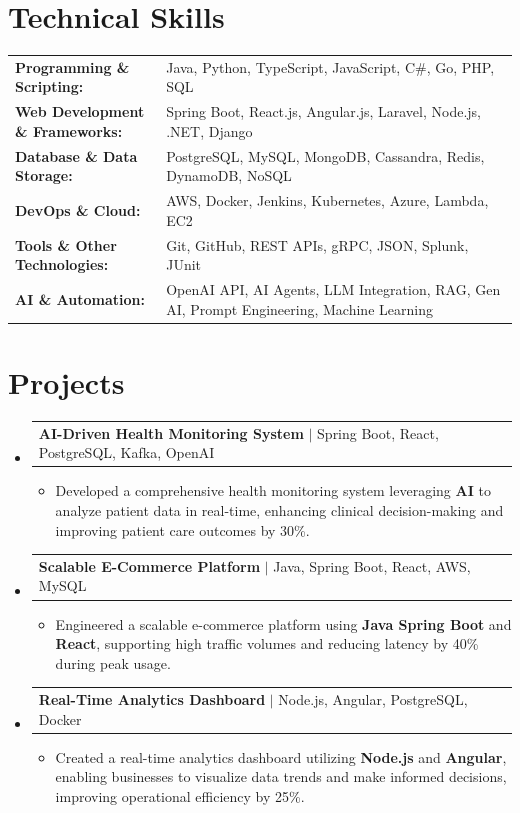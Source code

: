 \documentclass[letterpaper,10pt]{article}
\makeatletter
\newcommand{\resumeItem}[1]{
  \item{\fontsize{8pt}{9pt}\selectfont
    #1 \vspace{-3pt}
  }
}
\newcommand{\resumeProjectHeading}[2]{
    \item
    \begin{tabular*}{1.001\textwidth}{l@{\extracolsep{\fill}}r}
      \fontsize{8.5pt}{10pt}#1 & \textbf{\fontsize{8.5pt}{10pt} #2}\\
    \end{tabular*}\vspace{-7pt}
}
\newcommand{\resumeSubHeadingListStart}{\begin{itemize}[leftmargin=0pt, label={}]}
\newcommand{\resumeSubHeadingListEnd}{\end{itemize}}
\newcommand{\resumeItemListStart}{\begin{itemize}[leftmargin=*]}
\newcommand{\resumeItemListEnd}{\end{itemize}\vspace{-5pt}}
\makeatother
\begin{document}
\section{Technical Skills}
        \vspace{-14pt}
        \begin{table}[h]
            \fontsize{8pt}{9pt}\selectfont
            \begin{tabular}{p{0.3\linewidth} p{0.7\linewidth}}
                \textbf{Programming \& Scripting:} & Java, Python, TypeScript, JavaScript, C\#, Go, PHP, SQL \\
                \textbf{Web Development \& Frameworks:} & Spring Boot, React.js, Angular.js, Laravel, Node.js, .NET, Django \\
                \textbf{Database \& Data Storage:} & PostgreSQL, MySQL, MongoDB, Cassandra, Redis, DynamoDB, NoSQL \\
                \textbf{DevOps \& Cloud:} & AWS, Docker, Jenkins, Kubernetes, Azure, Lambda, EC2 \\
                \textbf{Tools \& Other Technologies:} & Git, GitHub, REST APIs, gRPC, JSON, Splunk, JUnit \\
                \textbf{AI \& Automation:} & OpenAI API, AI Agents, LLM Integration, RAG, Gen AI, Prompt Engineering, Machine Learning \\
            \end{tabular}
        \end{table}
 \vspace{-18pt}

\section{Projects}
    \vspace{-5pt}
    \resumeSubHeadingListStart
          \resumeProjectHeading
            {\textbf{AI-Driven Health Monitoring System} $|$ Spring Boot, React, PostgreSQL, Kafka, OpenAI}{}
            \resumeItemListStart
                \resumeItem{Developed a comprehensive health monitoring system leveraging \textbf{AI} to analyze patient data in real-time, enhancing clinical decision-making and improving patient care outcomes by 30\%.}
            \resumeItemListEnd
        \vspace{-12pt}
    
        \resumeProjectHeading
            {\textbf{Scalable E-Commerce Platform} $|$ Java, Spring Boot, React, AWS, MySQL}{}
        \resumeItemListStart
                \resumeItem{Engineered a scalable e-commerce platform using \textbf{Java Spring Boot} and \textbf{React}, supporting high traffic volumes and reducing latency by 40\% during peak usage.}
        \resumeItemListEnd
      \vspace{-12pt}
      \resumeProjectHeading
        {\textbf{Real-Time Analytics Dashboard} $|$ Node.js, Angular, PostgreSQL, Docker}{}
    \resumeItemListStart
            \resumeItem{Created a real-time analytics dashboard utilizing \textbf{Node.js} and \textbf{Angular}, enabling businesses to visualize data trends and make informed decisions, improving operational efficiency by 25\%.}
    \resumeItemListEnd
    \resumeSubHeadingListEnd
\end{document}
